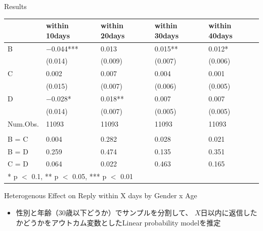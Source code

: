 \documentclass[
      aspectratio=169,
        12pt,
    ]{beamer}
\providecommand{\tightlist}{%
  \setlength{\itemsep}{0pt}\setlength{\parskip}{0pt}}
\begin{document}
\begin{frame}{Results}
\protect\hypertarget{results}{}
\begin{table}
\centering
\fontsize{9}{11}\selectfont
\begin{tabular}[t]{l>{\centering\arraybackslash}p{6em}>{\centering\arraybackslash}p{6em}>{\centering\arraybackslash}p{6em}>{\centering\arraybackslash}p{6em}}
\toprule
  & within 10days & within 20days & within 30days & within 40days\\
\midrule
B & \num{-0.044}*** & \num{0.013} & \num{0.015}** & \num{0.012}*\\
 & (\num{0.014}) & (\num{0.009}) & (\num{0.007}) & (\num{0.006})\\
C & \num{0.002} & \num{0.007} & \num{0.004} & \num{0.001}\\
 & (\num{0.015}) & (\num{0.007}) & (\num{0.006}) & (\num{0.005})\\
D & \num{-0.028}* & \num{0.018}** & \num{0.007} & \num{0.007}\\
 & (\num{0.014}) & (\num{0.007}) & (\num{0.005}) & (\num{0.005})\\
\midrule
Num.Obs. & \num{11093} & \num{11093} & \num{11093} & \num{11093}\\
\addlinespace[0.3em]
\multicolumn{5}{l}{\textit{F-tests, p-value}}\\
\hspace{1em}B = C & \num{0.004} & \num{0.282} & \num{0.028} & \num{0.021}\\
\hspace{1em}B = D & \num{0.259} & \num{0.474} & \num{0.135} & \num{0.351}\\
\hspace{1em}C = D & \num{0.064} & \num{0.022} & \num{0.463} & \num{0.165}\\
\bottomrule
\multicolumn{5}{l}{\rule{0pt}{1em}* p $<$ 0.1, ** p $<$ 0.05, *** p $<$ 0.01}\\
\end{tabular}
\end{table}
\end{frame}

\begin{frame}{Heterogenous Effect on Reply within X days by Gender x Age}
\protect\hypertarget{heterogenous-effect-on-reply-within-x-days-by-gender-x-age}{}
\begin{itemize}
\tightlist
\item
  性別と年齢（30歳以下どうか）でサンプルを分割して、
  \(X\)日以内に返信したかどうかをアウトカム変数としたLinear probability modelを推定
\end{itemize}
\end{frame}
\end{document}
